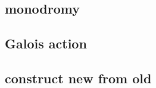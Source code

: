 \documentclass[reqno,11pt]{amsart}
\numberwithin{equation}{section}
\theoremstyle{plain}
\theoremstyle{plain}
\numberwithin{equation}{section}
\theoremstyle{remark}
\begin{document}
\subsection{monodromy}
\subsection{Galois action}
\subsection{construct new from old}

 




\end{document}

